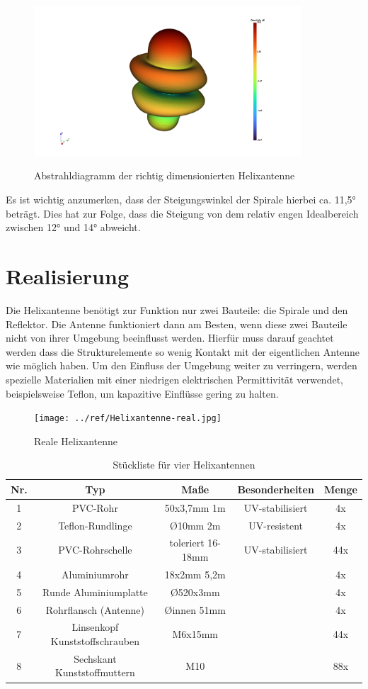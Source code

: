 \begin{figure}[H]
	\centering
	\includegraphics[width=10cm]{../ref/helix-fertig-radiation-pattern.png}
	\label{fig:fertigeHelix-Radiation}
	\caption{Abstrahldiagramm der richtig dimensionierten Helixantenne}
\end{figure}

Es ist wichtig anzumerken, dass der Steigungswinkel der Spirale hierbei ca. 11,5° beträgt. Dies hat zur Folge, dass die Steigung von dem relativ engen Idealbereich zwischen 12° und 14° abweicht.

\section{Realisierung}
Die Helixantenne benötigt zur Funktion nur zwei Bauteile: die Spirale und den Reflektor. Die Antenne funktioniert dann am Besten, wenn diese zwei Bauteile nicht von ihrer Umgebung beeinflusst werden. Hierfür muss darauf geachtet werden dass die Strukturelemente so wenig Kontakt mit der eigentlichen Antenne wie möglich haben. Um den Einfluss der Umgebung weiter zu verringern, werden spezielle Materialien mit einer niedrigen elektrischen Permittivität verwendet, beispielsweise Teflon, um kapazitive Einflüsse gering zu halten. 

\begin{figure}[H]
	\centering
	\texttt{[image: ../ref/Helixantenne-real.jpg]}
	\caption{Reale Helixantenne}
	\label{fig:helix-real}
\end{figure}

\begin{table}
	\begin{tabular}{|c|c|c|c|c|}
	\hline
	Nr. & Typ & Maße & Besonderheiten & Menge \\
	\hline
	1 & PVC-Rohr & 50x3,7mm 1m & UV-stabilisiert & 4x \\
	\hline
	2 & Teflon-Rundlinge & \O 10mm 2m & UV-resistent & 4x \\
	\hline
	3 & PVC-Rohrschelle & toleriert 16-18mm & UV-stabilisiert & 44x \\
	\hline
	4 & Aluminiumrohr & 18x2mm 5,2m & & 4x \\
	\hline
	5 & Runde Aluminiumplatte & \O 520x3mm & & 4x \\
	\hline
	6 & Rohrflansch (Antenne) & \O innen 51mm &  & 4x \\
	\hline
	7 & Linsenkopf Kunststoffschrauben & M6x15mm &  & 44x \\
	\hline
	8 & Sechskant Kunststoffmuttern & M10 &  & 88x \\
	\hline
\end{tabular}
\caption{Stückliste für vier Helixantennen}
\end{table}

